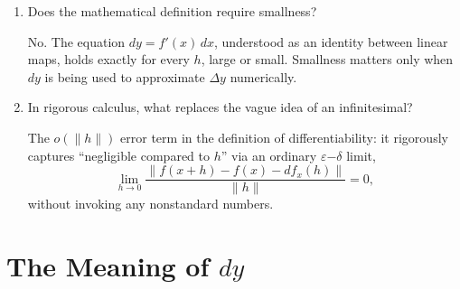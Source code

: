 \documentclass{essay}
\begin{document}
\begin{enumerate}[resume, leftmargin=*, itemsep=8pt]
\item Does the mathematical definition require smallness?
\begin{answer}
No. The equation \(dy=f'(x)\,dx\), understood as an identity between linear maps, holds exactly for every \(h\), large or small. Smallness matters only when \(dy\) is being used to approximate \(\Delta y\) numerically.
\end{answer}

\item In rigorous calculus, what replaces the vague idea of an infinitesimal?
\begin{answer}
The \(o(\|h\|)\) error term in the definition of differentiability: it rigorously captures ``negligible compared to \(h\)'' via an ordinary \(\varepsilon\)\(-\)\(\delta\) limit,
\[
\lim_{h\to0}\frac{\|f(x+h)-f(x)-df_x(h)\|}{\|h\|}=0,
\]
without invoking any nonstandard numbers.
\end{answer}

\end{enumerate}

\section{The Meaning of \texorpdfstring{$dy$}{dy}}
\end{document}
